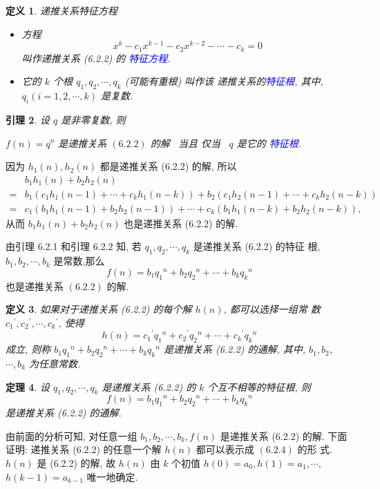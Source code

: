 \documentclass[punct]{ctexbeamer}
\newtheorem{thm}{定理}[section]
\newtheorem{defi}[thm]{定义}
\newtheorem{lem}[thm]{引理}
\newcommand{\blue}{\textcolor{blue}}
\def\pf{\noindent {\bf 证明\ }}
\begin{document}
\begin{frame}
	\begin{defi}{递推关系特征方程}
        \begin{itemize}
\item 	方程
\[
x^k-c_1 x^{k-1}-c_2 x^{k-2}-\cdots-c_k=0\tag{6.2.3}
\]
叫作递推关系 (6.2.2) 的 \blue{特征方程}.
\item  它的 $k$ 个根 $q_1, q_2, \cdots, q_k$ (可能有重根) 叫作该 递推关系的\blue{特征根}, 其中, $q_i(i=1,2, \cdots, k)$ 是复数.
        \end{itemize}

	\end{defi}
\begin{lem}
	设 $q$ 是非零复数, 则
   \begin{center}
    $f(n)=q^n$ 是递推关系 $(6.2 .2)$ 的解 \,
当且 仅当 \,  $q$ 是它的 \blue{特征根}.
   \end{center}

\end{lem}

\end{frame}

\begin{frame}
	\pf 因为 $h_1(n), h_2(n)$ 都是递推关系 (6.2.2) 的解, 所以
	$$\begin{aligned}
		&b_1 h_1(n)+b_2 h_2(n)\\
		=&b_1\left(c_1 h_1(n-1)+\cdots+c_k h_1(n-k)\right)
		+b_2\left(c_1 h_2(n-1)+\cdots+c_k h_2(n-k)\right) \\
		=& c_1\left(b_1 h_1(n-1)+b_2 h_2(n-1)\right)+\cdots+c_k\left(b_1 h_1(n-k)+b_2 h_2(n-k)\right),
	\end{aligned}
	$$
	从而 $b_1 h_1(n)+b_2 h_2(n)$ 也是递推关系 (6.2.2) 的解.

	由引理 6.2.1 和引理 $6.2 .2$ 知, 若 $q_1, q_2, \cdots, q_k$ 是递推关系 (6.2.2) 的特征 根, $b_1, b_2, \cdots, b_k$ 是常数,那么
	$$
	f(n)=b_1 q_1{ }^n+b_2 q_2{ }^n+\cdots+b_k q_k{ }^n
	$$
	也是递推关系 $(6.2 .2)$ 的解.
\end{frame}
\begin{frame}
	\begin{defi}
		如果对于递推关系 (6.2.2) 的每个解 $h(n)$, 都可以选择一组常 数 $c_1{ }^{\prime}, c_2{ }^{\prime}, \cdots, c_k{ }^{\prime}$, 使得
		$$
		h(n)=c_1{ }^{\prime} q_1{ }^n+c_2{ }^{\prime} q_2{ }^n+\cdots+c_k{ }^{\prime} q_k{ }^n
		$$
		成立, 则称 $b_1 q_1{ }^n+b_2 q_2{ }^n+\cdots+b_k q_k{ }^n$ 是递推关系 (6.2.2) 的通解, 其中, $b_1, b_2$, $\cdots, b_k$ 为任意常数.
	\end{defi}
\begin{thm}
	设 $q_1, q_2, \cdots, q_k$ 是递推关系 (6.2.2) 的 $k$ 个互不相等的特征根, 则
	\[
	f(n)=b_1 q_1{ }^n+b_2 q_2{ }^n+\cdots+b_k q_k{ }^n\tag{6.2.4}
	\]
	是递推关系 (6.2.2) 的通解.
\end{thm}
\pf 由前面的分析可知, 对任意一组 $b_1, b_2, \cdots, b_k, f(n)$ 是递推关系 (6.2.2) 的解.
下面证明: 递推关系 (6.2.2) 的任意一个解 $h(n)$ 都可以表示成 $(6.2 .4)$ 的形 式. $h(n)$ 是 (6.2.2) 的解, 故 $h(n)$ 由 $k$ 个初值 $h(0)=a_0, h(1)=a_1, \cdots$, $h(k-1)=a_{k-1}$ 唯一地确定.
\end{frame}
\end{document}
